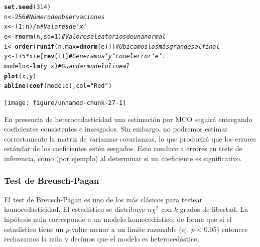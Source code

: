 \documentclass{article}\usepackage[]{graphicx}\usepackage[]{color}
\makeatletter
\newcommand{\hlnum}[1]{\textcolor[rgb]{0.686,0.059,0.569}{#1}}%
\newcommand{\hlstr}[1]{\textcolor[rgb]{0.192,0.494,0.8}{#1}}%
\newcommand{\hlcom}[1]{\textcolor[rgb]{0.678,0.584,0.686}{\textit{#1}}}%
\newcommand{\hlopt}[1]{\textcolor[rgb]{0,0,0}{#1}}%
\newcommand{\hlstd}[1]{\textcolor[rgb]{0.345,0.345,0.345}{#1}}%
\newcommand{\hlkwb}[1]{\textcolor[rgb]{0.69,0.353,0.396}{#1}}%
\newcommand{\hlkwc}[1]{\textcolor[rgb]{0.333,0.667,0.333}{#1}}%
\newcommand{\hlkwd}[1]{\textcolor[rgb]{0.737,0.353,0.396}{\textbf{#1}}}%
\newenvironment{kframe}{%
 \def\at@end@of@kframe{}%
 \ifinner\ifhmode%
  \def\at@end@of@kframe{\end{minipage}}%
  \begin{minipage}{\columnwidth}%
 \fi\fi%
 \def\FrameCommand##1{\hskip\@totalleftmargin \hskip-\fboxsep
 \colorbox{shadecolor}{##1}\hskip-\fboxsep
     \hskip-\linewidth \hskip-\@totalleftmargin \hskip\columnwidth}%
 \MakeFramed {\advance\hsize-\width
   \@totalleftmargin\z@ \linewidth\hsize
   \@setminipage}}%
 {\par\unskip\endMakeFramed%
 \at@end@of@kframe}
\newenvironment{knitrout}{}{} %
\makeatother
\begin{document}
\begin{knitrout}
\color{fgcolor}\begin{kframe}
\begin{alltt}
\hlkwd{set.seed}\hlstd{(}\hlnum{314}\hlstd{)}
\hlstd{n} \hlkwb{<-} \hlnum{256}                           \hlcom{# Número de observaciones}
\hlstd{x} \hlkwb{<-} \hlstd{(}\hlnum{1}\hlopt{:}\hlstd{n)}\hlopt{/}\hlstd{n}                       \hlcom{# Valores de `x`}
\hlstd{e} \hlkwb{<-} \hlkwd{rnorm}\hlstd{(n,} \hlkwc{sd}\hlstd{=}\hlnum{1}\hlstd{)}                \hlcom{# Valores aleatorios de una normal}
\hlstd{i} \hlkwb{<-} \hlkwd{order}\hlstd{(}\hlkwd{runif}\hlstd{(n,} \hlkwc{max}\hlstd{=}\hlkwd{dnorm}\hlstd{(e)))} \hlcom{# Ubicamos los más grandes al final}
\hlstd{y} \hlkwb{<-} \hlnum{1} \hlopt{+} \hlnum{5} \hlopt{*} \hlstd{x} \hlopt{+} \hlstd{e[}\hlkwd{rev}\hlstd{(i)]}         \hlcom{# Generamos `y` con el error `e`.}
\hlstd{modelo} \hlkwb{<-} \hlkwd{lm}\hlstd{(y} \hlopt{~} \hlstd{x)}                \hlcom{# Guardar modelo lineal}
\hlkwd{plot}\hlstd{(x, y)}
\hlkwd{abline}\hlstd{(}\hlkwd{coef}\hlstd{(modelo),} \hlkwc{col} \hlstd{=} \hlstr{"Red"}\hlstd{)}
\end{alltt}
\end{kframe}

{\centering \texttt{[image: figure/unnamed-chunk-27-1]} 

}



\end{knitrout}

En presencia de heterocedasticidad una estimación por MCO seguirá entregando coeficientes consistentes e insesgados. Sin embargo, no podremos estimar correctamente la matriz de varianzas-covarianzas, lo que producirá que los errores estándar de los coeficientes estén sesgados. Esto conduce a errores en tests de inferencia, como (por ejemplo) al determinar si un coeficiente es significativo.


\subsubsection{Test de Breusch-Pagan}

El test de Breusch-Pagan es uno de los más clásicos para testear homocedasticidad. El estadístico se distribuye $n\chi^2$ con $k$ grados de libertad. La hipótesis nula corresponde a un modelo homocedástico, de forma que si el estadístico tiene un $p$-value menor a un límite razonable (ej. $p<0.05$) entonces rechazamos la nula y decimos que el modelo es heterocedástico.
\end{document}
